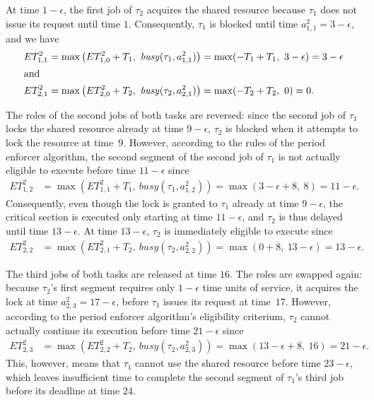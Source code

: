 At time $1-\epsilon$, the first job of $\tau_2$ acquires the shared resource because $\tau_1$ does not issue its request until time $1$. Consequently, $\tau_1$ is blocked until time $a^2_{1,1} = 3 - \epsilon$, and we have
\begin{align*}
	ET_{1,1}^2 & = \max\left(ET_{1,0}^2 + T_1,\ \mathit{busy}(\tau_1, a^2_{1,1})\right) =\max(-T_1 + T_1,\ 3 - \epsilon) = 3 - \epsilon
\\ \intertext{and}
	ET_{2,1}^2 & = \max\left(ET_{2,0}^2 + T_2,\ \mathit{busy}(\tau_2, a^2_{2,1})\right) =\max(-T_2 + T_2,\ 0) = 0.
\end{align*}

The roles of the second jobs of both tasks are reversed: since the second job of $\tau_1$ locks the shared resource already at time $9-\epsilon$, $\tau_2$ is blocked when it attempts to lock the resource at time~$9$. However, according to the rules of the period enforcer algorithm, the second segment of the second job of $\tau_1$ is not actually eligible to execute before time $11 - \epsilon$ since
\begin{align*}
	ET_{1,2}^2 & = \max\left(ET_{1,1}^2 + T_1,\ \mathit{busy}(\tau_1, a^2_{1,2})\right) =\max(3 - \epsilon + 8,\ 8) = 11 - \epsilon.
\end{align*}
Consequently, even though the lock is granted to $\tau_1$ already  at time $9-\epsilon$, the critical section is executed only starting at time $11 - \epsilon$, and $\tau_2$ is thus delayed until time $13 - \epsilon$. At time $13 - \epsilon$, $\tau_2$ is immediately eligible to execute since
\begin{align*}
	ET_{2,2}^2 & = \max\left(ET_{2,1}^2 + T_2,\ \mathit{busy}(\tau_2, a^2_{2,2})\right) =\max(0 + 8,\ 13 - \epsilon) = 13 - \epsilon.
\end{align*}

The third jobs of both tasks are released at time $16$. The roles are swapped again: because $\tau_2$'s first segment requires only $1-\epsilon$ time units of service, it acquires the lock at time $a^2_{2,3} = 17 - \epsilon$, before $\tau_1$ issues its request at time~$17$. However, according to the period enforcer algorithm's eligibility criterium, $\tau_2$ cannot actually continue its execution before time $21- \epsilon$ since
\begin{align*}
	ET_{2,3}^2 & = \max\left(ET_{2,2}^2 + T_2,\ \mathit{busy}(\tau_2, a^2_{2,3})\right) =\max(13- \epsilon + 8,\ 16) = 21- \epsilon.
\end{align*}
This, however, means that $\tau_1$ cannot use the shared resource before time $23 - \epsilon$, which leaves insufficient time to complete the second segment of $\tau_1$'s third job before its deadline at time $24$.

